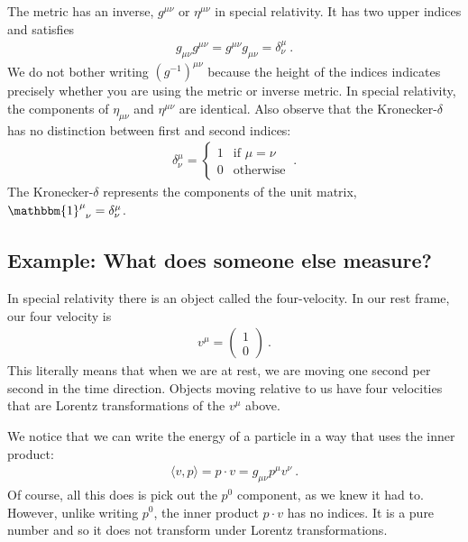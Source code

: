 \documentclass[12pt, oneside]{report}    %
\begin{document}
The metric has an inverse, $g^{\mu\nu}$ or $\eta^{\mu\nu}$ in special relativity. It has two upper indices and satisfies
\begin{align}
    g_{\mu\nu}g^{\mu\nu} = g^{\mu\nu}g_{\mu\nu} = \delta^\mu_\nu \ .
\end{align}
We do not bother writing $(g^{-1})^{\mu\nu}$ because the height of the indices indicates precisely whether you are using the metric or inverse metric. In special relativity, the components of $\eta_{\mu\nu}$ and $\eta^{\mu\nu}$ are identical. Also observe that the Kronecker-$\delta$ has no distinction between first and second indices:
\begin{align}
    \delta^\mu_\nu =
    \begin{cases}
    1 & \text{if } \mu = \nu \\
    0 & \text{otherwise} 
    \end{cases}
    \ .
\end{align}
The Kronecker-$\delta$ represents the components of the unit matrix, $\mathbbm{1}\aij{\mu}{\nu} = \delta^\mu_\nu$.


\subsection{Example: What does someone else measure?}
\label{sec:relativity:alien}


In special relativity there is an object called the four-velocity. In our rest frame, our four velocity is
\begin{align}
    v^\mu = \begin{pmatrix}
        1\\ 0
    \end{pmatrix} \ .
    \label{eq:4:velocity:in:rest:Frame}
\end{align}
This literally means that when we are at rest, we are moving one second per second in the time direction. Objects moving relative to us have four velocities that are Lorentz transformations of the $v^\mu$ above. 

We notice that we can write the energy of a particle in a way that uses the inner product:
\begin{align}
    \langle v, p\rangle = p\cdot v = g_{\mu\nu} p^\mu v^\nu \ .
\end{align}
Of course, all this does is pick out the $p^0$ component, as we knew it had to. However, unlike writing $p^0$, the inner product $p\cdot v$ has no indices. It is a pure number and so it does not transform under Lorentz transformations. 
\end{document}
